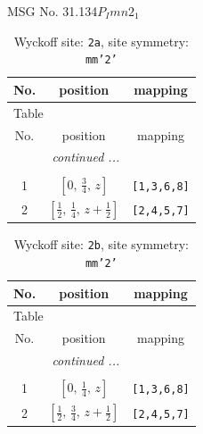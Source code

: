 \documentclass[fleqn,8pt]{jsarticle}
\begin{document}
\setcounter{MaxMatrixCols}{32}

\renewcommand{\tablename}{Table~}
\renewcommand{\figurename}{Figure~}
\begin{center}
\LARGE
MSG No. 31.134\quad$P_{I}mn2_{1}$
\end{center}
\renewcommand{\arraystretch}{1.2}
\begin{longtable}{ccc}
\caption{Wyckoff site: {\tt 2a}, site symmetry: {\tt mm'2'}}
 \\
 \hline \hline
No. & position & mapping \\ \hline \endfirsthead

\multicolumn{2}{l}{\tablename\ \thetable{}} \\
 \hline \hline
No. & position & mapping \\ \hline \endhead

 \hline \hline
\multicolumn{2}{r}{\footnotesize\it continued ...} \\ \endfoot

 \hline \hline
\multicolumn{2}{r}{} \\ \endlastfoot

1 & $\left[ 0,\, \frac{3}{4},\, z \right]$ & {\tt [1,3,6,8]} \\ \hline
2 & $\left[ \frac{1}{2},\, \frac{1}{4},\, z + \frac{1}{2} \right]$ & {\tt [2,4,5,7]} \\
\end{longtable}
\renewcommand{\arraystretch}{1.2}
\begin{longtable}{ccc}
\caption{Wyckoff site: {\tt 2b}, site symmetry: {\tt mm'2'}}
 \\
 \hline \hline
No. & position & mapping \\ \hline \endfirsthead

\multicolumn{2}{l}{\tablename\ \thetable{}} \\
 \hline \hline
No. & position & mapping \\ \hline \endhead

 \hline \hline
\multicolumn{2}{r}{\footnotesize\it continued ...} \\ \endfoot

 \hline \hline
\multicolumn{2}{r}{} \\ \endlastfoot

1 & $\left[ 0,\, \frac{1}{4},\, z \right]$ & {\tt [1,3,6,8]} \\ \hline
2 & $\left[ \frac{1}{2},\, \frac{3}{4},\, z + \frac{1}{2} \right]$ & {\tt [2,4,5,7]} \\
\end{longtable}
\end{document}
